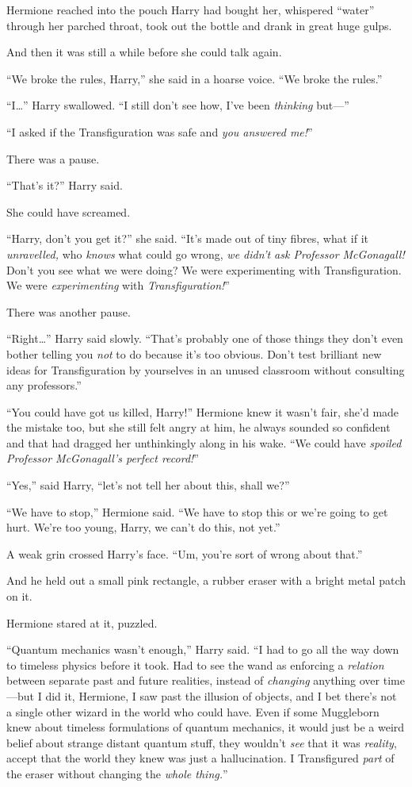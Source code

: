 Hermione reached into the pouch Harry had bought her, whispered “water” through her parched throat, took out the bottle and drank in great huge gulps.

And then it was still a while before she could talk again.

“We broke the rules, Harry,” she said in a hoarse voice. “We broke the rules.”

“I…” Harry swallowed. “I still don’t see how, I’ve been \emph{thinking} but—”

“I asked if the Transfiguration was safe and \emph{you answered me!}”

There was a pause.

“That’s it?” Harry said.

She could have screamed.

“Harry, don’t you get it?” she said. “It’s made out of tiny fibres, what if it \emph{unravelled,} who \emph{knows} what could go wrong, \emph{we didn’t ask Professor McGonagall!} Don’t you see what we were doing? We were experimenting with Transfiguration. We were \emph{experimenting} with \emph{Transfiguration!}”

There was another pause.

“Right…” Harry said slowly. “That’s probably one of those things they don’t even bother telling you \emph{not} to do because it’s too obvious. Don’t test brilliant new ideas for Transfiguration by yourselves in an unused classroom without consulting any professors.”

“You could have got us killed, Harry!” Hermione knew it wasn’t fair, she’d made the mistake too, but she still felt angry at him, he always sounded so confident and that had dragged her unthinkingly along in his wake. “We could have \emph{spoiled Professor McGonagall’s perfect record!}”

“Yes,” said Harry, “let’s not tell her about this, shall we?”

“We have to stop,” Hermione said. “We have to stop this or we’re going to get hurt. We’re too young, Harry, we can’t do this, not yet.”

A weak grin crossed Harry’s face. “Um, you’re sort of wrong about that.”

And he held out a small pink rectangle, a rubber eraser with a bright metal patch on it.

Hermione stared at it, puzzled.

“Quantum mechanics wasn’t enough,” Harry said. “I had to go all the way down to timeless physics before it took. Had to see the wand as enforcing a \emph{relation} between separate past and future realities, instead of \emph{changing} anything over time—but I did it, Hermione, I saw past the illusion of objects, and I bet there’s not a single other wizard in the world who could have. Even if some Muggleborn knew about timeless formulations of quantum mechanics, it would just be a weird belief about strange distant quantum stuff, they wouldn’t \emph{see} that it was \emph{reality}, accept that the world they knew was just a hallucination. I Transfigured \emph{part} of the eraser without changing the \emph{whole thing.}”

